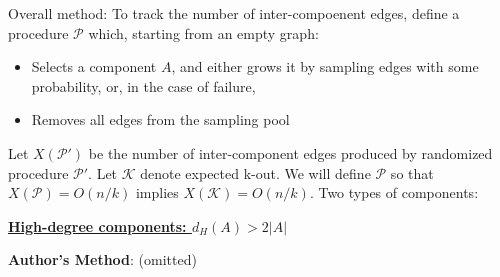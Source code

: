 \documentclass{article}
\begin{document}
	Overall method: To track the number of inter-compoenent edges, define a procedure $\mathcal P$ which, starting from an empty graph:
	\begin{itemize}
		\item Selects a component $A$, and either grows it by sampling edges with some probability, or, in the case of failure,
		\item Removes all edges from the sampling pool
	\end{itemize}
	Let $X(\mathcal P')$ be the number of inter-component edges produced by randomized procedure $\mathcal P'$. Let $\mathcal K$ denote expected k-out. We will define $\mathcal P$ so that $X(\mathcal P) = O(n / k)$ implies $X(\mathcal K) = O(n / k)$.
	Two types of components:


	\vspace{1cm}
	\noindent \underline{\textbf{\large High-degree components: $d_H(A) > 2\left| A \right|$}}
		
	\textbf{Author's Method}: 
	(omitted)
\end{document}
